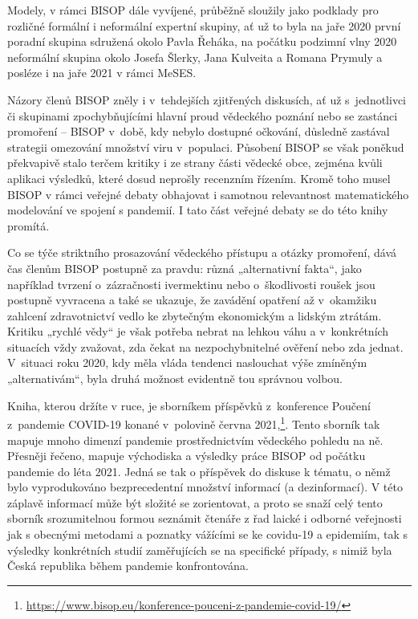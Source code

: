 Modely, v rámci BISOP dále vyvíjené, průběžně sloužily jako podklady pro rozličné formální i neformální expertní skupiny, ať už to byla na jaře 2020 první poradní skupina sdružená okolo Pavla Řeháka, na počátku podzimní vlny 2020 neformální skupina okolo Josefa Šlerky, Jana Kulveita a Romana Prymuly a posléze i na jaře 2021 v rámci MeSES.

Názory členů BISOP zněly i v~tehdejších zjitřených diskusích, ať už s~jednotlivci či skupinami zpochybňujícími hlavní proud vědeckého poznání nebo se zastánci promoření -- BISOP v~době, kdy nebylo dostupné očkování, důsledně zastával strategii omezování množství viru v~populaci. Působení BISOP se však poněkud překvapivě stalo terčem kritiky i ze strany části vědecké obce, zejména kvůli aplikaci výsledků, které dosud neprošly recenzním řízením. Kromě toho musel BISOP v rámci veřejné debaty obhajovat i samotnou relevantnost matematického modelování ve spojení s pandemií. I tato část veřejné debaty se do této knihy promítá. 

Co se týče striktního prosazování vědeckého přístupu a otázky promoření, dává čas členům BISOP postupně za pravdu: různá „alternativní fakta“, jako například tvrzení o~zázračnosti ivermektinu nebo o~škodlivosti roušek jsou postupně vyvracena a také se ukazuje, že zavádění opatření až v~okamžiku zahlcení zdravotnictví vedlo ke zbytečným ekonomickým a lidským ztrátám. Kritiku „rychlé vědy“ je však potřeba nebrat na lehkou váhu a v~konkrétních situacích vždy zvažovat, zda čekat na nezpochybnitelné ověření nebo zda jednat. V~situaci roku 2020, kdy měla vláda tendenci naslouchat výše zmíněným „alternativám“, byla druhá možnost evidentně tou správnou volbou.


Kniha, kterou držíte v ruce, je sborníkem příspěvků z~konference Poučení z~pandemie COVID-19 konané v~polovině června 2021,\footnote{\url{https://www.bisop.eu/konference-pouceni-z-pandemie-covid-19/}}. Tento sborník tak mapuje mnoho dimenzí pandemie prostřednictvím vědeckého pohledu na ně. Přesněji řečeno, mapuje východiska a výsledky práce BISOP od počátku pandemie do léta 2021. Jedná se tak o příspěvek do diskuse k tématu, o němž bylo vyprodukováno bezprecedentní množství informací (a dezinformací). V této záplavě informací může být složité se zorientovat, a proto se snaží celý tento sborník srozumitelnou formou seznámit čtenáře z řad laické i odborné veřejnosti jak s obecnými metodami a poznatky vážícími se ke covidu-19 a epidemiím, tak s výsledky konkrétních studií zaměřujících se na specifické případy, s nimiž byla Česká republika během pandemie konfrontována.


